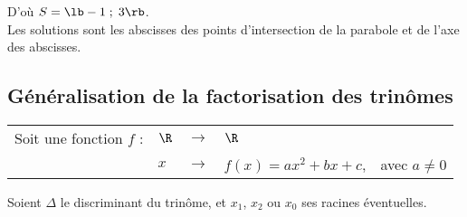 D'où $S = \lb -1 \; ; \; 3 \rb$. \\

Les solutions sont les abscisses des points d'intersection de la parabole et de l'axe des abscisses.

\newpage

\subsection{Généralisation de la factorisation des trinômes}

\begin{tabular}{lllll}
Soit une fonction $f$ : & $\R$ & $\longrightarrow$ & $\R$ & \\
& $x$ & $\longrightarrow$ & $f\left(x\right) = ax^2 + bx + c$, & avec $a \neq 0$ \\ 
\end{tabular}

\vspace*{.3cm}

Soient $\Delta$ le discriminant du trinôme, et $x_1$, $x_2$ ou $x_0$ ses racines éventuelles. \\

